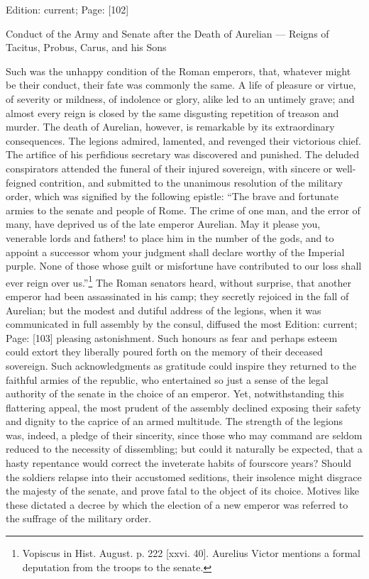 Edition: current; Page: [102]


Conduct of the Army and Senate after the Death of Aurelian \texthebrew{—} Reigns of Tacitus, Probus, Carus, and his Sons

Such was the unhappy condition of the Roman emperors, that, whatever might be their conduct, their fate was commonly the same. A life of pleasure or virtue, of severity or mildness, of indolence or glory, alike led to an untimely grave; and almost every reign is closed by the same disgusting repetition of treason and murder. The death of Aurelian, however, is remarkable by its extraordinary consequences. The legions admired, lamented, and revenged their victorious chief. The artifice of his perfidious secretary was discovered and punished. The deluded conspirators attended the funeral of their injured sovereign, with sincere or well-feigned contrition, and submitted to the unanimous resolution of the military order, which was signified by the following epistle: \texthebrew{“}The brave and fortunate armies to the senate and people of Rome. The crime of one man, and the error of many, have deprived us of the late emperor Aurelian. May it please you, venerable lords and fathers! to place him in the number of the gods, and to appoint a successor whom your judgment shall declare worthy of the Imperial purple. None of those whose guilt or misfortune have contributed to our loss shall ever reign over us.\texthebrew{}”\footnote{Vopiscus in Hist. August. p. 222 [xxvi. 40]. Aurelius Victor mentions a formal deputation from the troops to the senate.} The Roman senators heard, without surprise, that another emperor had been assassinated in his camp; they secretly rejoiced in the fall of Aurelian; but the modest and dutiful address of the legions, when it was communicated in full assembly by the consul, diffused the most Edition: current; Page: [103] pleasing astonishment. Such honours as fear and perhaps esteem could extort they liberally poured forth on the memory of their deceased sovereign. Such acknowledgments as gratitude could inspire they returned to the faithful armies of the republic, who entertained so just a sense of the legal authority of the senate in the choice of an emperor. Yet, notwithstanding this flattering appeal, the most prudent of the assembly declined exposing their safety and dignity to the caprice of an armed multitude. The strength of the legions was, indeed, a pledge of their sincerity, since those who may command are seldom reduced to the necessity of dissembling; but could it naturally be expected, that a hasty repentance would correct the inveterate habits of fourscore years? Should the soldiers relapse into their accustomed seditions, their insolence might disgrace the majesty of the senate, and prove fatal to the object of its choice. Motives like these dictated a decree by which the election of a new emperor was referred to the suffrage of the military order.

